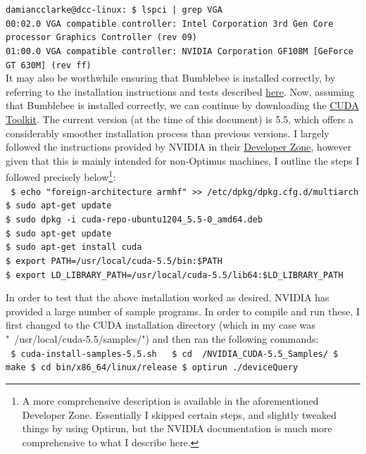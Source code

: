 \documentclass[a4paper,10pt]{article}
\begin{document}
\texttt{damiancclarke@dcc-linux:~\$ lspci | grep VGA} \\
\indent\texttt{00:02.0 VGA compatible controller: Intel Corporation 3rd Gen Core processor Graphics Controller (rev 09)} \\
\indent\texttt{01:00.0 VGA compatible controller: NVIDIA Corporation GF108M [GeForce GT 630M] (rev ff)} \\

It may also be worthwhile ensuring that Bumblebee is installed correctly, by 
referring to the installation instructions and tests described
\href{https://wiki.ubuntu.com/Bumblebee#Installation}{here}.  Now, assuming 
that Bumblebee is installed correctly, we can continue by downloading the 
\href{https://developer.nvidia.com/cuda-downloads?sid=412586}{CUDA Toolkit}.
The current version (at the time of this document) is 5.5, which offers a
considerably smoother installation process than previous versions.  I largely
followed the instructions provided by NVIDIA in their
\href{http://docs.nvidia.com/cuda/cuda-getting-started-guide-for-linux/}{
Developer Zone}, however given that this is mainly intended for non-Optimus
machines, I outline the steps I followed precisely below\footnote{A more
comprehensive description is available in the aforementioned Developer Zone.
Essentially I skipped certain steps, and slightly tweaked things by using 
Optirun, but the NVIDIA documentation is much more comprehensive to what I
describe here.}: \\
\texttt{
\$ echo "foreign-architecture armhf" >> /etc/dpkg/dpkg.cfg.d/multiarch \\
\$ sudo apt-get update \\
\$ sudo dpkg -i cuda-repo-ubuntu1204\_5.5-0\_amd64.deb \\
\$ sudo apt-get update \\
\$ sudo apt-get install cuda \\
\$ export PATH=/usr/local/cuda-5.5/bin:\$PATH \\
\$ export LD\_LIBRARY\_PATH=/usr/local/cuda-5.5/lib64:\$LD\_LIBRARY\_PATH \\
}

In order to test that the above installation worked as desired, NVIDIA has 
provided a large number of sample programs.  In order to compile and run these,
I first changed to the CUDA installation directory (which in my case was
"~/usr/local/cuda-5.5/samples/") and then ran the following commands: \\
\texttt{
\$ cuda-install-samples-5.5.sh  ~
\$ cd ~/NVIDIA\_CUDA-5.5\_Samples/
\$ make
\$ cd bin/x86\_64/linux/release
\$ optirun ./deviceQuery
}
\end{document}
